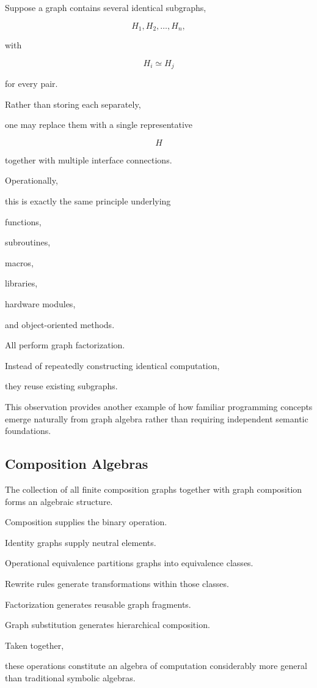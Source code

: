 \documentclass[12pt,oneside]{article}
\begin{document}
Suppose a graph contains several identical subgraphs,

\[
H_1,
H_2,
\ldots,
H_n,
\]

with

\[
H_i
\simeq
H_j
\]

for every pair.

Rather than storing each separately,

one may replace them with a single representative

\[
H
\]

together with multiple interface connections.

Operationally,

this is exactly the same principle underlying

functions,

subroutines,

macros,

libraries,

hardware modules,

and object-oriented methods.

All perform graph factorization.

Instead of repeatedly constructing identical computation,

they reuse existing subgraphs.

This observation provides another example of how familiar programming concepts emerge naturally from graph algebra rather than requiring independent semantic foundations.

\subsection{Composition Algebras}

The collection of all finite composition graphs together with graph composition forms an algebraic structure.

Composition supplies the binary operation.

Identity graphs supply neutral elements.

Operational equivalence partitions graphs into equivalence classes.

Rewrite rules generate transformations within those classes.

Factorization generates reusable graph fragments.

Graph substitution generates hierarchical composition.

Taken together,

these operations constitute an algebra of computation considerably more general than traditional symbolic algebras.
\end{document}
